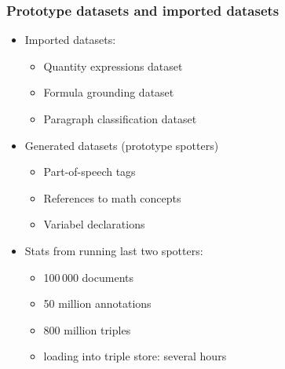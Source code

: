 \documentclass[aspectratio=169]{beamer}
\begin{document}
\begin{frame}[fragile]
\end{frame}



\begin{frame}
    \frametitle{Prototype datasets and imported datasets}
    \begin{itemize}
        \item Imported datasets:
            \begin{itemize}
                \item Quantity expressions dataset~\cite{Rabenstein:msc17}
                \item Formula grounding dataset~\cite{asakura-miyao-aizawa:2022:LREC}
                \item Paragraph classification dataset~\cite{ginev-miller-2020-scientific}
            \end{itemize}
        \item Generated datasets (prototype spotters)
            \begin{itemize}
                \item Part-of-speech tags
                \item References to math concepts
                \item Variabel declarations
            \end{itemize}
        \item Stats from running last two spotters:
            \begin{itemize}
                \item 100\,000 documents
                \item 50 million annotations
                \item 800 million triples
                \item loading into triple store: several hours
            \end{itemize}
    \end{itemize}
\end{frame}
\end{document}
